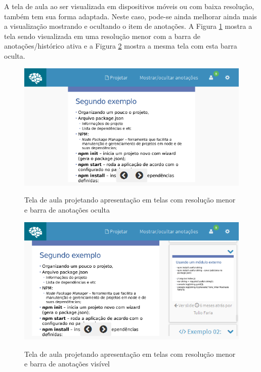 A tela de aula ao ser visualizada em dispositivos móveis ou com baixa resolução, também tem sua forma adaptada. Neste caso, pode-se ainda melhorar ainda mais a visualização mostrando e ocultando o item de anotações. A Figura \ref{fig:tela_aula_mob} mostra a tela sendo visualizada em uma resolução menor com a barra de anotações/histórico ativa e a Figura \ref{fig:tela_aula_mob_anot} mostra a mesma tela com esta barra oculta.

\begin{figure}[h]
\centering
\caption{Tela de aula projetando apresentação em telas com resolução menor e barra de anotações oculta}
\includegraphics[width=1.0\textwidth]{imgs/tela_aula_slide_mob.png} 
\label{fig:tela_aula_mob} 
\end{figure}

\begin{figure}[h]
\centering
\caption{Tela de aula projetando apresentação em telas com resolução menor e barra de anotações visível}
\includegraphics[width=1.0\textwidth]{imgs/tela_aula_slide_mob_anotacoes.png} 
\label{fig:tela_aula_mob_anot} 
\end{figure}

